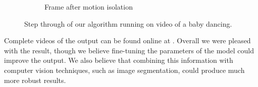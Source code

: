 \begin{figure}[tb]
\begin{subfigure}[b]{0.33\textwidth}
		\caption{Frame after motion isolation}
	\end{subfigure}%

	\caption{Step through of our algorithm running on video of a baby dancing.}
	\label{fig:bimbodance}
\end{figure}

Complete videos of the output can be found online at .
Overall we were pleased with the result, though we believe fine-tuning the
parameters of the model could improve the output.  We also believe that
combining this information with computer vision techniques, such as image
segmentation, could produce much more robust results.







